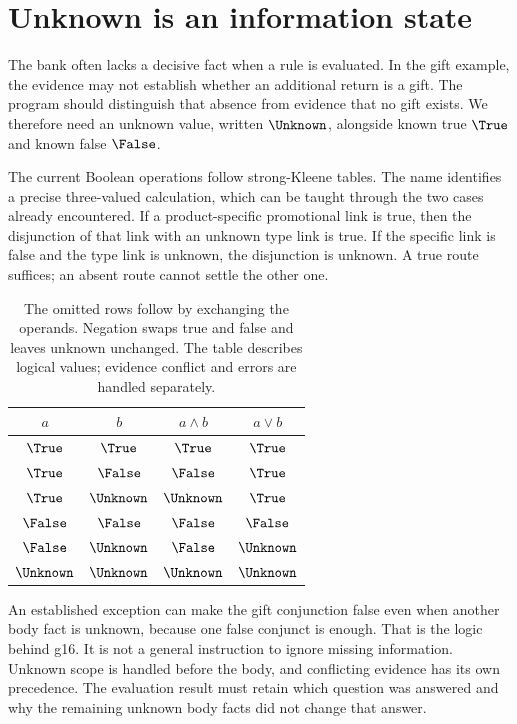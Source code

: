 \section{Unknown is an information state}
\label{merge:M03:05}

\label{sec:proof-unknown}
The bank often lacks a decisive fact when a rule is evaluated. In the gift
example, the evidence may not establish whether an additional return is a gift.
The program should distinguish that absence from evidence that no gift exists.
We therefore need an unknown value, written $\Unknown$, alongside known true
$\True$ and known false $\False$.

The current Boolean operations follow strong-Kleene tables. The name identifies
a precise three-valued calculation, which can be taught through the two cases
already encountered. If a product-specific promotional link is true, then the
disjunction of that link with an unknown type link is true. If the specific
link is false and the type link is unknown, the disjunction is unknown. A true
route suffices; an absent route cannot settle the other one.

\begin{table}[htbp]
\centering
\begin{tabular}{cc|cc}
\toprule
$a$ & $b$ & $a\land b$ & $a\lor b$\\
\midrule
$\True$ & $\True$ & $\True$ & $\True$\\
$\True$ & $\False$ & $\False$ & $\True$\\
$\True$ & $\Unknown$ & $\Unknown$ & $\True$\\
$\False$ & $\False$ & $\False$ & $\False$\\
$\False$ & $\Unknown$ & $\False$ & $\Unknown$\\
$\Unknown$ & $\Unknown$ & $\Unknown$ & $\Unknown$\\
\bottomrule
\end{tabular}
\caption{The omitted rows follow by exchanging the operands. Negation swaps
true and false and leaves unknown unchanged. The table describes logical values;
evidence conflict and errors are handled separately.}
\label{tab:kleene}
\end{table}

An established exception can make the gift conjunction false even when another
body fact is unknown, because one false conjunct is enough. That is the logic
behind g16. It is not a general instruction to ignore missing information.
Unknown scope is handled before the body, and conflicting evidence has its own
precedence. The evaluation result must retain which question was answered and
why the remaining unknown body facts did not change that answer.

